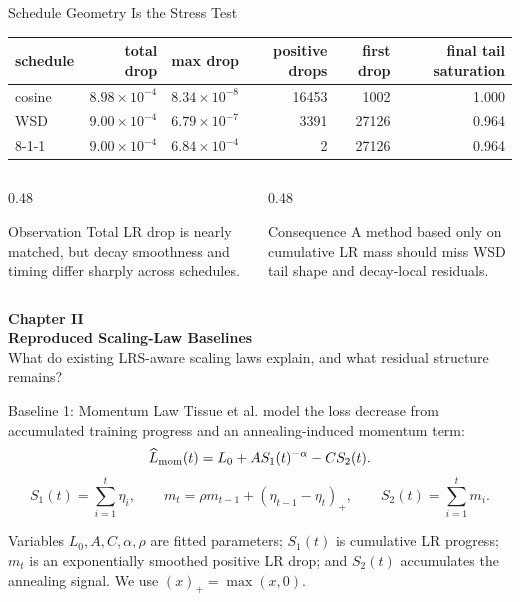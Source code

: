 \documentclass[fontset=fandol,aspectratio=169,10pt]{ctexbeamer}
\begin{document}
\begin{frame}{Schedule Geometry Is the Stress Test}
  \begin{table}
    \centering
    \scriptsize
    \begin{tabular}{lrrrrr}
      \toprule
      schedule & total drop & max drop & positive drops & first drop & final tail saturation\\
      \midrule
      cosine & \(8.98{\times}10^{-4}\) & \(8.34{\times}10^{-8}\) & 16453 & 1002 & 1.000\\
      WSD & \(9.00{\times}10^{-4}\) & \(6.79{\times}10^{-7}\) & 3391 & 27126 & 0.964\\
      8-1-1 & \(9.00{\times}10^{-4}\) & \(6.84{\times}10^{-4}\) & 2 & 27126 & 0.964\\
      \bottomrule
    \end{tabular}
  \end{table}
  \begin{columns}[T,onlytextwidth]
    \begin{column}{0.48\textwidth}
      \begin{block}{Observation}
        Total LR drop is nearly matched, but decay smoothness and timing differ
        sharply across schedules.
      \end{block}
    \end{column}
    \begin{column}{0.48\textwidth}
      \begin{block}{Consequence}
        A method based only on cumulative LR mass should miss WSD tail shape and
        decay-local residuals.
      \end{block}
    \end{column}
  \end{columns}
\end{frame}

\begin{frame}[plain]
  \begin{center}
    \vspace{2.2em}
    {\Large\color{tdltBlue}\textbf{Chapter II}}\\[0.5em]
    {\huge\textbf{Reproduced Scaling-Law Baselines}}\\[0.8em]
    \small What do existing LRS-aware scaling laws explain, and what residual structure remains?
  \end{center}
\end{frame}

\begin{frame}{Baseline 1: Momentum Law}
  Tissue et al. model the loss decrease from accumulated training progress and
  an annealing-induced momentum term:
  \[
    \widehat L_{\rm mom}(t)=L_0+A S_1(t)^{-\alpha}-C S_2(t).
  \]
  \[
    S_1(t)=\sum_{i=1}^{t}\eta_i,\qquad
    m_t=\rho m_{t-1}+(\eta_{t-1}-\eta_t)_+,\qquad
    S_2(t)=\sum_{i=1}^{t}m_i .
  \]
  \begin{block}{Variables}
    \(L_0,A,C,\alpha,\rho\) are fitted parameters; \(S_1(t)\) is cumulative
    LR progress; \(m_t\) is an exponentially smoothed positive LR drop; and
    \(S_2(t)\) accumulates the annealing signal. We use
    \((x)_+=\max(x,0)\).
  \end{block}
\end{frame}
\end{document}
